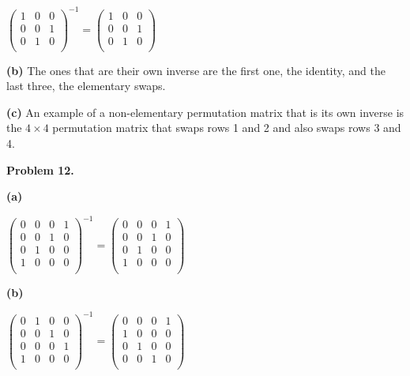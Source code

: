 \documentclass[oneside,12pt]{amsart}
\begin{document}
$
\begin{pmatrix}
1 & 0 & 0 \\
0 & 0 & 1 \\
0 & 1 & 0 \\
\end{pmatrix}^{-1}
=
\begin{pmatrix}
1 & 0 & 0 \\
0 & 0 & 1 \\
0 & 1 & 0 \\
\end{pmatrix}
$

\bigskip

\textbf{(b)} The ones that are their own inverse are the first one, the
identity, and the last three, the elementary swaps.

\bigskip

\textbf{(c)} An example of a non-elementary permutation matrix that is
its own inverse is the $4\times 4$ permutation matrix that swaps
rows 1 and 2 and also swaps rows 3 and 4.

\bigskip

\textbf{Problem 12.}

\textbf{(a)}

$
\begin{pmatrix}
0 & 0 & 0 & 1 \\
0 & 0 & 1 & 0 \\
0 & 1 & 0 & 0 \\
1 & 0 & 0 & 0 \\
\end{pmatrix}^{-1}=
\begin{pmatrix}
0 & 0 & 0 & 1 \\
0 & 0 & 1 & 0 \\
0 & 1 & 0 & 0 \\
1 & 0 & 0 & 0 \\
\end{pmatrix}
$

\bigskip

\textbf{(b)}

$
\begin{pmatrix}
0 & 1 & 0 & 0 \\
0 & 0 & 1 & 0 \\
0 & 0 & 0 & 1 \\
1 & 0 & 0 & 0 \\
\end{pmatrix}^{-1}=
\begin{pmatrix}
0 & 0 & 0 & 1 \\
1 & 0 & 0 & 0 \\
0 & 1 & 0 & 0 \\
0 & 0 & 1 & 0 \\
\end{pmatrix}
$
\end{document}
